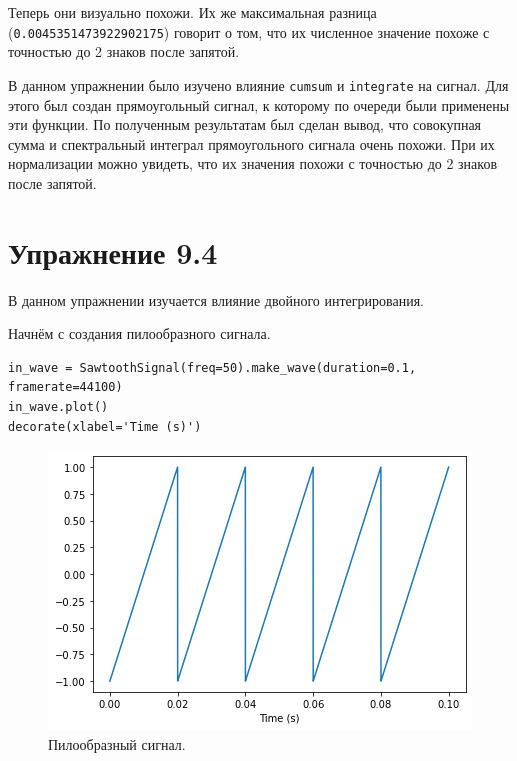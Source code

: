 \documentclass[a4paper, 14pt]{extarticle}
\begin{document}
    Теперь они визуально похожи. Их же максимальная разница (\texttt{0.0045351473922902175}) говорит о том, что их
    численное значение похоже с точностью до 2 знаков после запятой.

    В данном упражнении было изучено влияние \texttt{cumsum} и \texttt{integrate} на сигнал. Для этого был создан
    прямоугольный сигнал, к которому по очереди были применены эти функции. По полученным результатам был сделан вывод,
    что совокупная сумма и спектральный интеграл прямоугольного сигнала очень похожи. При их нормализации можно увидеть,
    что их значения похожи с точностью до 2 знаков после запятой.

    \newpage

    \section{Упражнение 9.4}
    \label{sec:task4}

    В данном упражнении изучается влияние двойного интегрирования.

    Начнём с создания пилообразного сигнала.

    \begin{lstlisting}[caption= Создание пилообразного сигнала., label={lst:task4_in_sawtooth}]
in_wave = SawtoothSignal(freq=50).make_wave(duration=0.1, framerate=44100)
in_wave.plot()
decorate(xlabel='Time (s)')     \end{lstlisting}

    \begin{figure}[h]
        \centering
        \includegraphics[width=0.8\linewidth]{resources/Images/task4_in_sawtooth}
        \caption{Пилообразный сигнал.}
        \label{fig:task4_in_sawtooth}
    \end{figure}
\end{document}
